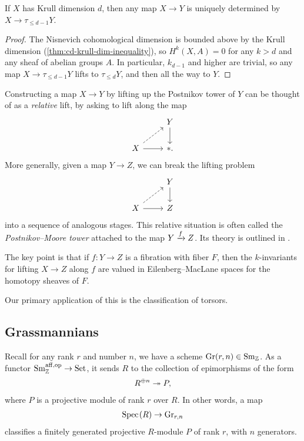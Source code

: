 \documentclass[11pt,openany]{book}
\providecommand{\aff}{\mathrm{aff}}
\begin{document}
\begin{theorem}\label{thm:krull-dim-postnikov-truncation} 
If $X$ has Krull dimension $d$, then any map $X \to Y$ is uniquely determined by $X \to \tau_{\le d-1}Y$.
\end{theorem}
\begin{proof} The Nisnevich cohomological dimension is bounded above by the Krull dimension (\autoref{thm:cd-krull-dim-inequality}), so $H^{k}(X,A) = 0$ for any $k>d$ and any sheaf of abelian groups $A$. In particular, $k_{d-1}$ and higher are trivial, so any map $X \to \tau_{\le d-1} Y$ lifts to $\tau_{\le d} Y$, and then all the way to $Y$.
\end{proof}




\begin{remark} Constructing a map $X \to Y$ by lifting up the Postnikov tower of $Y$ can be thought of as a \textit{relative} lift, by asking to lift along the map
\[\begin{tikzcd}
     & Y\dar\\
    X\rar\ar[ur,dashed] & \ast.
\end{tikzcd} \]
More generally, given a map $Y \to Z$, we can break the lifting problem
\[ \begin{tikzcd}
     & Y\dar\\
    X\rar\ar[ur,dashed] & Z
\end{tikzcd} \]
into a sequence of analogous stages. This relative situation is often called the \textit{Postnikov--Moore tower} attached to the map $Y \xrightarrow{f} Z$. Its theory is outlined in \cite[\S B]{Morel}.
\end{remark}

The key point is that if $f\colon Y \to Z$ is a fibration with fiber $F$, then the $k$-invariants for lifting $X \to Z$ along $f$ are valued in Eilenberg--MacLane spaces for the homotopy sheaves of $F$.



Our primary application of this is the classification of torsors.



\subsection{Grassmannians}

Recall for any rank $r$ and number $n$, we have a scheme $\mathrm{Gr}(r,n) \in \mathrm{Sm}_{\mathbb{Z}}$. As a functor $\Sm_\Z^{\aff,\op} \to \Set$, it sends $R$ to the collection of epimorphisms of the form
\begin{align*}
    R^{\oplus n} \twoheadrightarrow P,
\end{align*}
where $P$ is a projective module of rank $r$ over $R$. In other words, a map
\begin{align*}
    \text{Spec}\hspace{0.1em}(R) \to \mathrm{Gr}_{r,n}
\end{align*}
classifies a finitely generated projective $R$-module $P$ of rank $r$, with $n$ generators.
\end{document}
